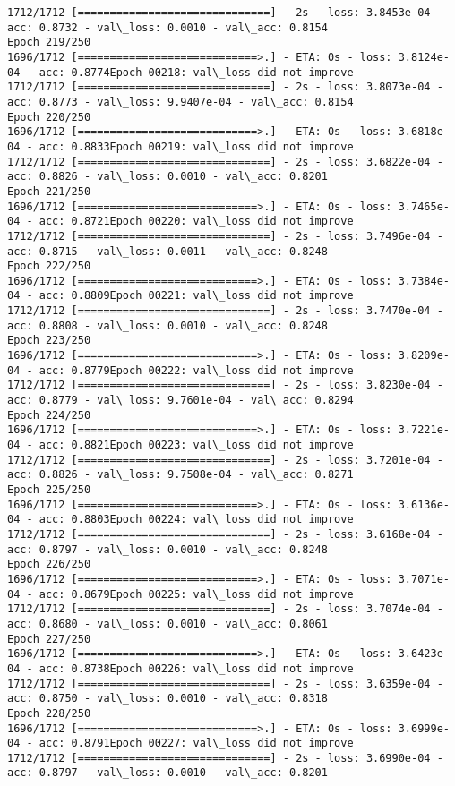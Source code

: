 \documentclass[11pt]{article}
\begin{document}
\begin{Verbatim}[commandchars=\\\{\}]
1712/1712 [==============================] - 2s - loss: 3.8453e-04 - acc: 0.8732 - val\_loss: 0.0010 - val\_acc: 0.8154
Epoch 219/250
1696/1712 [============================>.] - ETA: 0s - loss: 3.8124e-04 - acc: 0.8774Epoch 00218: val\_loss did not improve
1712/1712 [==============================] - 2s - loss: 3.8073e-04 - acc: 0.8773 - val\_loss: 9.9407e-04 - val\_acc: 0.8154
Epoch 220/250
1696/1712 [============================>.] - ETA: 0s - loss: 3.6818e-04 - acc: 0.8833Epoch 00219: val\_loss did not improve
1712/1712 [==============================] - 2s - loss: 3.6822e-04 - acc: 0.8826 - val\_loss: 0.0010 - val\_acc: 0.8201
Epoch 221/250
1696/1712 [============================>.] - ETA: 0s - loss: 3.7465e-04 - acc: 0.8721Epoch 00220: val\_loss did not improve
1712/1712 [==============================] - 2s - loss: 3.7496e-04 - acc: 0.8715 - val\_loss: 0.0011 - val\_acc: 0.8248
Epoch 222/250
1696/1712 [============================>.] - ETA: 0s - loss: 3.7384e-04 - acc: 0.8809Epoch 00221: val\_loss did not improve
1712/1712 [==============================] - 2s - loss: 3.7470e-04 - acc: 0.8808 - val\_loss: 0.0010 - val\_acc: 0.8248
Epoch 223/250
1696/1712 [============================>.] - ETA: 0s - loss: 3.8209e-04 - acc: 0.8779Epoch 00222: val\_loss did not improve
1712/1712 [==============================] - 2s - loss: 3.8230e-04 - acc: 0.8779 - val\_loss: 9.7601e-04 - val\_acc: 0.8294
Epoch 224/250
1696/1712 [============================>.] - ETA: 0s - loss: 3.7221e-04 - acc: 0.8821Epoch 00223: val\_loss did not improve
1712/1712 [==============================] - 2s - loss: 3.7201e-04 - acc: 0.8826 - val\_loss: 9.7508e-04 - val\_acc: 0.8271
Epoch 225/250
1696/1712 [============================>.] - ETA: 0s - loss: 3.6136e-04 - acc: 0.8803Epoch 00224: val\_loss did not improve
1712/1712 [==============================] - 2s - loss: 3.6168e-04 - acc: 0.8797 - val\_loss: 0.0010 - val\_acc: 0.8248
Epoch 226/250
1696/1712 [============================>.] - ETA: 0s - loss: 3.7071e-04 - acc: 0.8679Epoch 00225: val\_loss did not improve
1712/1712 [==============================] - 2s - loss: 3.7074e-04 - acc: 0.8680 - val\_loss: 0.0010 - val\_acc: 0.8061
Epoch 227/250
1696/1712 [============================>.] - ETA: 0s - loss: 3.6423e-04 - acc: 0.8738Epoch 00226: val\_loss did not improve
1712/1712 [==============================] - 2s - loss: 3.6359e-04 - acc: 0.8750 - val\_loss: 0.0010 - val\_acc: 0.8318
Epoch 228/250
1696/1712 [============================>.] - ETA: 0s - loss: 3.6999e-04 - acc: 0.8791Epoch 00227: val\_loss did not improve
1712/1712 [==============================] - 2s - loss: 3.6990e-04 - acc: 0.8797 - val\_loss: 0.0010 - val\_acc: 0.8201

\end{Verbatim}
\end{document}
